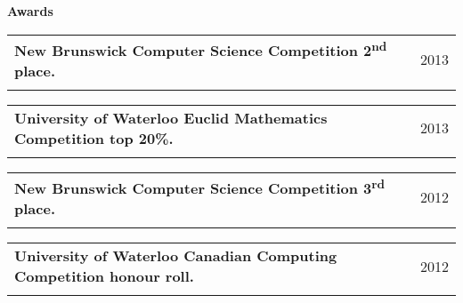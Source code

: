 \documentclass[letterpaper,11pt]{article}
\makeatletter
\newcommand{\resheading}[1]{{\large \colorbox{mygrey}{\begin{minipage}{\textwidth}{\textbf{#1 \vphantom{p\^{E}}}}\end{minipage}}}}
\newcommand{\ressubheading}[4]{
\begin{tabular*}{7.0in}{l@{\extracolsep{\fill}}r}
		\textbf{#1} & #2 \\
		\textit{#3} & \textit{#4} \\
\end{tabular*}\vspace{-6pt}}
\makeatother
\begin{document}
\resheading{Awards}
\begin{description}
\item
	\ressubheading{New Brunswick Computer Science Competition 2\textsuperscript{nd} place.}{2013}{}{}
\item
	\ressubheading{University of Waterloo Euclid Mathematics Competition top 20\%.} {2013} {} {}

\item
\ressubheading{New Brunswick Computer Science Competition 3\textsuperscript{rd} place.}{2012}{}{}
\item
\ressubheading{University of Waterloo Canadian Computing Competition honour roll.}{2012}{}{}
\end{description}
\end{document}
